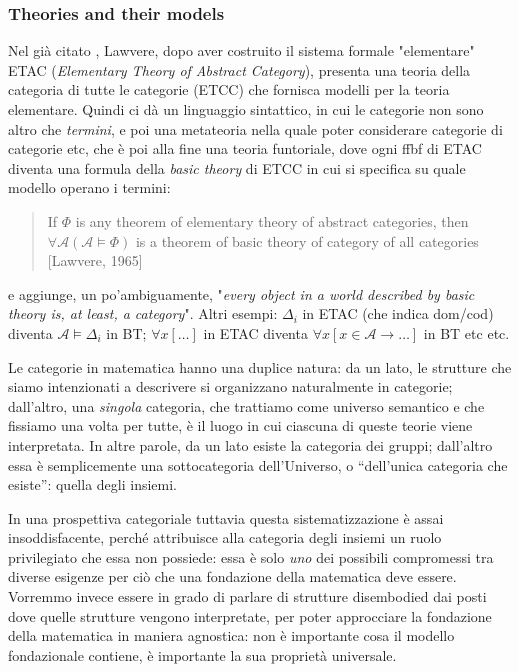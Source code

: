 \documentclass{amsart}
\begin{document}
\subsubsection{Theories and their models}
Nel già citato \cite{}, Lawvere, dopo aver costruito il sistema formale "elementare" ETAC (\emph{Elementary Theory of Abstract Category}), presenta una teoria della categoria di tutte le categorie (ETCC) che fornisca modelli per la teoria elementare. Quindi ci dà un linguaggio sintattico, in cui le categorie non sono altro che \emph{termini}, e poi una metateoria nella quale poter considerare categorie di categorie etc, che è poi alla fine una teoria funtoriale, dove ogni ffbf di ETAC diventa una formula della \emph{basic theory} di ETCC in cui si specifica su quale modello operano i termini:
\begin{quote}
	If $\Phi$ is any theorem of elementary theory of abstract categories, then $ \forall \mathcal{A} (\mathcal{A} \models \Phi)$ is a theorem of basic theory of category of all categories [Lawvere, 1965]
\end{quote}
e aggiunge, un po'ambiguamente, "\textit{every object in a world described by basic theory is, at least, a category}". Altri esempi: $\Delta_i$ in ETAC (che indica dom/cod) diventa $\mathcal{A} \models \Delta_i$ in BT; $\forall x [\dots]$ in ETAC diventa $\forall x [x \in \mathcal{A} \rightarrow \dots]$ in BT etc etc.

Le categorie in matematica hanno una duplice natura: da un lato, le strutture che siamo intenzionati a descrivere si organizzano naturalmente in categorie; dall'altro, una \emph{singola} categoria, che trattiamo come universo semantico e che fissiamo una volta per tutte, è il luogo in cui ciascuna di queste teorie viene interpretata. In altre parole, da un lato esiste la categoria dei gruppi; dall'altro essa è semplicemente una sottocategoria dell'Universo, o ``dell'unica categoria che esiste'': quella degli insiemi.

In una prospettiva categoriale tuttavia questa sistematizzazione è assai insoddisfacente, perché attribuisce alla categoria degli insiemi un ruolo privilegiato che essa non possiede: essa è solo \emph{uno} dei possibili compromessi tra diverse esigenze per ciò che una fondazione della matematica deve essere. Vorremmo invece essere in grado di parlare di strutture disembodied dai posti dove quelle strutture vengono interpretate, per poter approcciare la fondazione della matematica in maniera agnostica: non è importante cosa il modello fondazionale contiene, è importante la sua proprietà universale.
\end{document}
